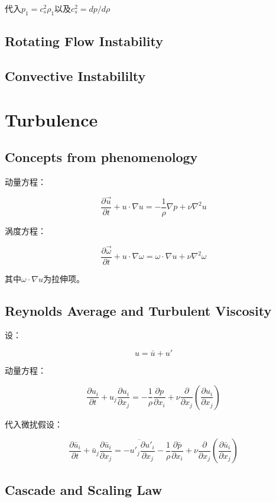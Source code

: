 \documentclass[fontset=windows]{report}
\begin{document}
代入\(p_1=c_s^2\rho_1\)以及\(c_s^2=dp/d\rho\)


\section{Rotating Flow Instability}
\section{Convective Instabililty}



\chapter{Turbulence}
\section{Concepts from phenomenology}

动量方程：

\[\frac{\partial \vec u}{\partial t}+u\cdot\nabla u=-\frac{1}{\rho}\nabla p+\nu \nabla^2u\]

涡度方程：

\[\frac{\partial \vec \omega}{\partial t}+u\cdot\nabla \omega=\omega\cdot\nabla u+\nu \nabla^2\omega\]

其中\(\omega\cdot \nabla u\)为拉伸项。


\section{Reynolds Average and Turbulent Viscosity}

设：

\[u=\bar{u}+u'\]

动量方程：

\[\frac{\partial u_i}{\partial t}+u_j\frac{\partial u_i}{\partial x_j}=-\frac{1}{\rho}\frac{\partial p}{\partial x_i}+\nu\frac{\partial}{\partial x_j}(\frac{\partial u_i}{\partial x_j})\]

代入微扰假设：

\[\frac{\partial \bar u_i}{\partial t}+\bar u_j\frac{\partial \bar u_i}{\partial x_j}
 = 
\overline{ -u'_j\frac{\partial u'_i}{\partial x_j}}-\frac{1}{\rho}\frac{\partial \bar p}{\partial x_i}+\nu\frac{\partial}{\partial x_j}(\frac{\partial \bar u_i}{\partial x_j})\]


\section{Cascade and Scaling Law}
\end{document}
